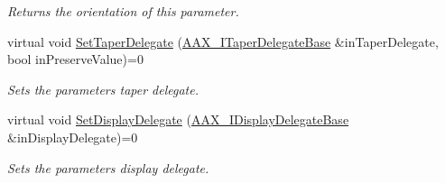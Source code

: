 \begin{DoxyCompactItemize}
\begin{DoxyCompactList}\small\item\em Returns the orientation of this parameter. \end{DoxyCompactList}\item 
virtual void \hyperlink{a00108_a809a5c7f712ed2e5c55e30b6d5557c59}{Set\+Taper\+Delegate} (\hyperlink{a00115}{A\+A\+X\+\_\+\+I\+Taper\+Delegate\+Base} \&in\+Taper\+Delegate, bool in\+Preserve\+Value)=0
\begin{DoxyCompactList}\small\item\em Sets the parameter\textquotesingle{}s taper delegate. \end{DoxyCompactList}\item 
virtual void \hyperlink{a00108_a16a75d76f077051eb6f852cde28f5152}{Set\+Display\+Delegate} (\hyperlink{a00093}{A\+A\+X\+\_\+\+I\+Display\+Delegate\+Base} \&in\+Display\+Delegate)=0
\begin{DoxyCompactList}\small\item\em Sets the parameter\textquotesingle{}s display delegate. \end{DoxyCompactList}\end{DoxyCompactItemize}
